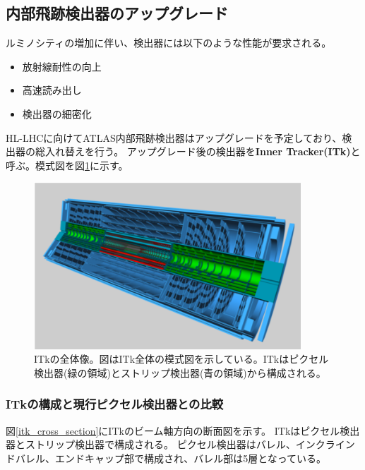 \subsection{内部飛跡検出器のアップグレード}
ルミノシティの増加に伴い、検出器には以下のような性能が要求される。
\begin{itemize}
  \item 放射線耐性の向上
  \item 高速読み出し
  \item 検出器の細密化
\end{itemize}

HL-LHCに向けてATLAS内部飛跡検出器はアップグレードを予定しており、検出器の総入れ替えを行う。
アップグレード後の検出器を\textbf{Inner Tracker(ITk)}と呼ぶ。模式図を図\ref{itk_image}に示す。

\begin{figure}[bpt]\centering
\includegraphics[width=10cm]{./itk_image.png}
\caption[ITkの全体像]{ITkの全体像\cite{1-3}。図はITk全体の模式図を示している。ITkはピクセル検出器(緑の領域)とストリップ検出器(青の領域)から構成される。}
\label{itk_image}
\end{figure}

\subsubsection{ITkの構成と現行ピクセル検出器との比較}
図\ref{itk_cross_section}にITkのビーム軸方向の断面図を示す。
ITkはピクセル検出器とストリップ検出器で構成される。
ピクセル検出器はバレル、インクラインドバレル、エンドキャップ部で構成され、バレル部は5層となっている。

